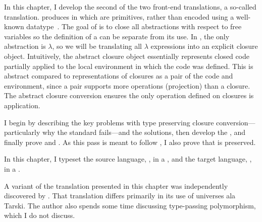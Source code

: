 In this chapter, I develop the second of the two front-end
 translations, a so-called  translation.
produces   in which  are
primitives, rather than encoded using a well-known datatype~\cite{minamide1996}.
The goal of  is to close
all 
abstractions with respect to free variables so the definition of
a  can be separate from its use.
In \slang, the only  abstraction is \(\lambda\), so we will be
translating all \(\lambda\) expressions into an explicit closure object.
Intuitively, the abstract closure object essentially represents closed code
partially applied to the local environment in which the code was defined.
This is abstract compared to representations of closures as a pair of the code
and environment, since a pair supports more operations (projection) than a
closure.
The abstract closure conversion ensures the only operation defined on closures
is application.

I begin by describing the key problems with type preserving closure
conversion---particularly why the standard 
fails---and the solutions, then develop the  ,
and finally prove  and .
As this pass is meant to follow , I also prove that  is
preserved.

\begin{typographical}
 In this chapter, I typeset the source language, \slang, in
 a \emph{}, and the target
 language, \tlang, in a \emph{}.
\end{typographical}

\begin{digression}
  A variant of the translation presented in this chapter was independently discovered by \citet{kovacs2018:cconv}. That translation differs primarily in its use of universes ala Tarski. The author also spends some time discussing type-passing polymorphism, which I do not discuss.
\end{digression}
